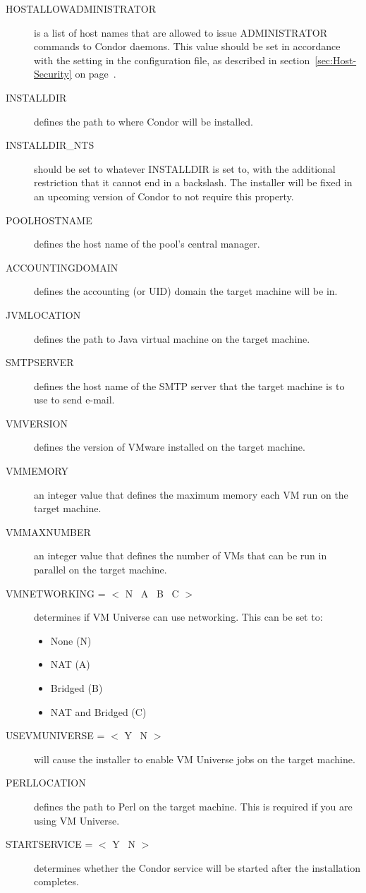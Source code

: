 \begin{description}
\item[HOSTALLOWADMINISTRATOR]
is a list of host names that are allowed to issue ADMINISTRATOR commands to
Condor daemons. This value should be set in accordance with the
 setting in the configuration file, 
as described in
section~\ref{sec:Host-Security} on page~\pageref{sec:Host-Security}.

\item[INSTALLDIR]
defines the path to where Condor will be installed. 

\item[INSTALLDIR\_NTS]
should be set to whatever INSTALLDIR is set to, with the additional
restriction that it cannot end in a backslash. The installer will be fixed
in an upcoming version of Condor to not require this property.

\item[POOLHOSTNAME]
defines the host name of the pool's central manager. 

\item[ACCOUNTINGDOMAIN] 
defines the accounting (or UID) domain the target machine will be in.

\item[JVMLOCATION]
defines the path to Java virtual machine on the target machine.

\item[SMTPSERVER]
defines the host name of the SMTP server that the target machine is to
use to send e-mail.

\item [VMVERSION]
defines the version of VMware installed on the target machine.

\item [VMMEMORY]
an integer value that defines the maximum memory each VM run on the target
machine.

\item [VMMAXNUMBER]
an integer value that defines the number of VMs that can be run in parallel
on the target machine.

\item [VMNETWORKING = $<$ N \Bar\ A \Bar\ B \Bar\ C $>$]
determines if VM Universe can use networking. This can be set to:
\begin{itemize}
\item None (N)
\item NAT (A)
\item Bridged (B)
\item NAT and Bridged (C)
\end{itemize}

\item [USEVMUNIVERSE = $<$ Y \Bar\ N $>$]
will cause the installer to enable VM Universe jobs on the target machine.


\item[PERLLOCATION]
defines the path to Perl on the target machine. This is required if you
are using VM Universe.

\item [STARTSERVICE = $<$ Y \Bar\ N $>$]
determines whether the Condor service will be started after the installation
completes.
\end {description}


